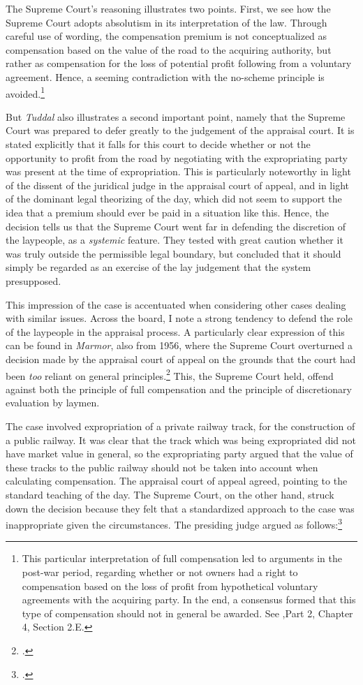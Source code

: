 The Supreme Court's reasoning illustrates two points. First, we see how the Supreme Court adopts absolutism in its interpretation of the law. Through careful use of wording, the compensation premium is not conceptualized as compensation based on the value of the road to the acquiring authority, but rather as compensation for the loss of potential profit following from a voluntary agreement. Hence, a seeming contradiction with the no-scheme principle is avoided.\footnote{This particular interpretation of full compensation led to arguments in the post-war period, regarding whether or not owners had a right to compensation based on the loss of profit from hypothetical voluntary agreements with the acquiring party. In the end, a consensus formed that this type of compensation should not in general be awarded. See \cite{nut69},Part 2, Chapter 4, Section 2.E.}

But {\it Tuddal} also illustrates a second important point, namely that the Supreme Court was prepared to defer greatly to the judgement of the appraisal court. It is stated explicitly that it falls for this court to decide whether or not the opportunity to profit from the road by negotiating with the expropriating party was present at the time of expropriation. This is particularly noteworthy in light of the dissent of the juridical judge in the appraisal court of appeal, and in light of the dominant legal theorizing of the day, which did  not seem to support the idea that a premium should ever be paid in a situation like this. Hence, the decision tells us that the Supreme Court went far in defending the discretion of the laypeople, as a \emph{systemic} feature. They tested with great caution whether it was truly outside the permissible legal boundary, but concluded that it should simply be regarded as an exercise of the lay judgement that the system presupposed.

This impression of the case is accentuated when considering other cases dealing with similar issues. Across the board, I note a strong  tendency to defend the role of the laypeople in the appraisal process. A particularly clear expression of this can be found in \emph{Marmor}, also from 1956, where the Supreme Court overturned a decision made by the appraisal court of appeal on the grounds that the court had been {\it too} reliant on general principles.\footnote{\cite{marmor56}.} This, the Supreme Court held, offend against both the principle of full compensation and the principle of discretionary evaluation by laymen.

The case involved expropriation of a private railway track, for the construction of a public railway. It was clear that the track which was being expropriated did not have market value in general, so the expropriating party argued that the value of these tracks to the public railway should not be taken into account when calculating compensation. The appraisal court of appeal agreed, pointing to the standard teaching of the day. The Supreme Court, on the other hand, struck down the decision because they felt that a standardized approach to the case was inappropriate given the circumstances. The presiding judge argued as follows:\footcite[498-499]{marmor56}

